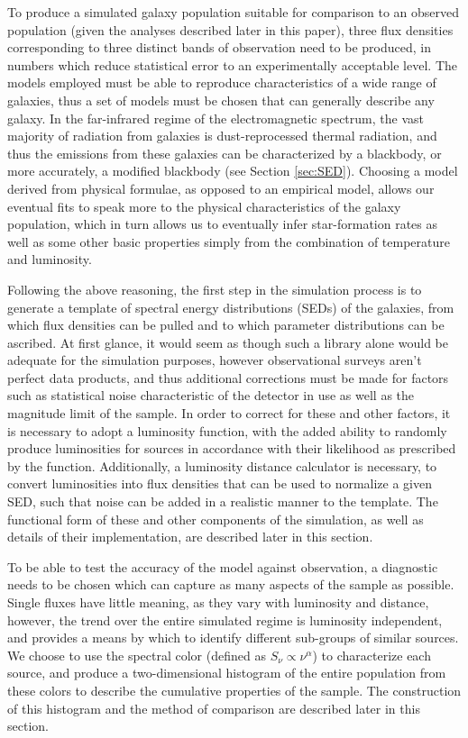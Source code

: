 \documentclass[twocolumn,letterpaper,10pt]{article}
\begin{document}
To produce a simulated galaxy population suitable for comparison to an observed population (given the analyses described later in this paper), three flux densities corresponding to three distinct bands of observation need to be produced, in numbers which reduce statistical error to an experimentally acceptable level. The models employed must be able to reproduce characteristics of a wide range of galaxies, thus a set of models must be chosen that can generally describe any galaxy. In the far-infrared regime of the electromagnetic spectrum, the vast majority of radiation from galaxies is dust-reprocessed thermal radiation, and thus the emissions from these galaxies can be characterized by a blackbody, or more accurately, a modified blackbody (see Section \ref{sec:SED}). Choosing a model derived from physical formulae, as opposed to an empirical model, allows our eventual fits to speak more to the physical characteristics of the galaxy population, which in turn allows us to eventually infer star-formation rates as well as some other basic properties simply from the combination of temperature and luminosity.

Following the above reasoning, the first step in the simulation process is to generate a template of spectral energy distributions (SEDs) of the galaxies, from which flux densities can be pulled and to which parameter distributions can be ascribed. At first glance, it would seem as though such a library alone would be adequate for the simulation purposes, however observational surveys aren't perfect data products, and thus additional corrections must be made for factors such as statistical noise characteristic of the detector in use as well as the magnitude limit of the sample. In order to correct for these and other factors, it is necessary to adopt a luminosity function, with the added ability to randomly produce luminosities for sources in accordance with their likelihood as prescribed by the function. Additionally, a luminosity distance calculator is necessary, to convert luminosities into flux densities that can be used to normalize a given SED, such that noise can be added in a realistic manner to the template. The functional form of these and other components of the simulation, as well as details of their implementation, are described later in this section.

To be able to test the accuracy of the model against observation, a diagnostic needs to be chosen which can capture as many aspects of the sample as possible. Single fluxes have little meaning, as they vary with luminosity and distance, however, the trend over the entire simulated regime is luminosity independent, and provides a means by which to identify different sub-groups of similar sources. We choose to use the spectral color (defined as $S_\nu\propto\nu^\alpha$) to characterize each source, and produce a two-dimensional histogram of the entire population from these colors to describe the cumulative properties of the sample. The construction of this histogram and the method of comparison are described later in this section.
\end{document}
